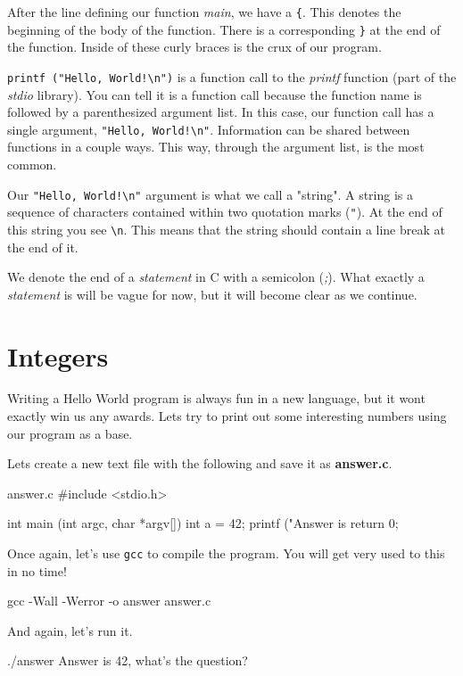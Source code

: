 \documentclass[12pt]{article}
\newcommand{\file}[1]{{\bf\ttfamily #1}}
\newcommand{\ident}[1]{{\it\ttfamily #1}}
\begin{document}
After the line defining our function \ident{main}, we have a \verb|{|. This
denotes the beginning of the body of the function. There is a corresponding
\verb|}| at the end of the function. Inside of these curly braces is the crux
of our program.

\verb|printf ("Hello, World!\n")| is a function call to the \ident{printf}
function (part of the \ident{stdio} library). You can tell it is a function call
because the function name is followed by a parenthesized argument list.  In this
case, our function call has a single argument, \verb|"Hello, World!\n"|.
Information can be shared between functions in a couple ways. This way, through
the argument list, is the most common.

Our \verb|"Hello, World!\n"| argument is what we call a "string". A string is a
sequence of characters contained within two quotation marks (\verb|"|).  At the
end of this string you see \verb|\n|.  This means that the string should contain
a line break at the end of it.

We denote the end of a \ident{statement} in C with a semicolon (\ident{;}).
What exactly a \ident{statement} is will be vague for now, but it will become
clear as we continue.

\section{Integers}

Writing a Hello World program is always fun in a new language, but it wont
exactly win us any awards. Lets try to print out some interesting numbers
using our program as a base.

Lets create a new text file with the following and save it as \file{answer.c}.

\begin{code}{answer.c}
#include <stdio.h>

int
main (int   argc,
      char *argv[])
{
    int a = 42;
    printf ("Answer is %
    return 0;
}
\end{code}

Once again, let's use \verb|gcc| to compile the program. You will get very used
to this in no time!

\begin{Terminal}
gcc -Wall -Werror -o answer answer.c
\end{Terminal}

And again, let's run it.

\begin{Terminal}
./answer
Answer is 42, what's the question?
\end{Terminal}
\end{document}
